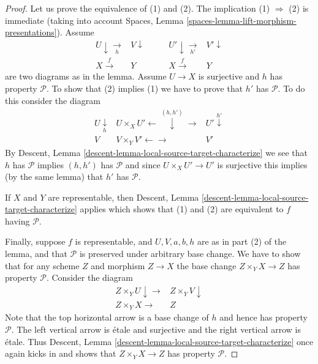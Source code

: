 \begin{proof}
Let us prove the equivalence of (1) and (2).
The implication (1) $\Rightarrow$ (2) is immediate (taking into account
Spaces, Lemma \ref{spaces-lemma-lift-morphism-presentations}).
Assume
$$
\begin{array}{cc}U \downarrow\underset{h}{\longrightarrow} & V \downarrow \\ X \overset{f}{\longrightarrow} & Y\end{array}
\quad\quad
\begin{array}{cc}U' \downarrow\underset{h'}{\longrightarrow} & V' \downarrow \\ X \overset{f}{\longrightarrow} & Y\end{array}
$$
are two diagrams as in the lemma. Assume $U \to X$ is
surjective and $h$ has property $\mathcal{P}$. To show that (2)
implies (1) we have to prove that $h'$ has $\mathcal{P}$. To do
this consider the diagram
$$
\begin{array}{ccc}U \underset{h}{\downarrow} & U \times_X U' \longleftarrow\overset{(h, h')}{\downarrow}\longrightarrow & U' \overset{h'}{\downarrow} \\ V & V \times_Y V' \longleftarrow\longrightarrow & V'\end{array}
$$
By
Descent, Lemma \ref{descent-lemma-local-source-target-characterize}
we see that $h$ has $\mathcal{P}$ implies $(h, h')$ has $\mathcal{P}$
and since $U \times_X U' \to U'$ is surjective this implies (by the
same lemma) that $h'$ has $\mathcal{P}$.

\medskip\noindent
If $X$ and $Y$ are representable, then
Descent, Lemma \ref{descent-lemma-local-source-target-characterize}
applies which shows that (1) and (2) are equivalent to $f$ having
$\mathcal{P}$.

\medskip\noindent
Finally, suppose $f$ is representable, and $U, V, a, b, h$ are
as in part (2) of the lemma, and that $\mathcal{P}$ is preserved under
arbitrary base change. We have to show that for any scheme
$Z$ and morphism $Z \to X$ the base change $Z \times_Y X \to Z$
has property $\mathcal{P}$. Consider the diagram
$$
\begin{array}{cc}Z \times_Y U \downarrow\longrightarrow & Z \times_Y V \downarrow \\ Z \times_Y X \longrightarrow & Z\end{array}
$$
Note that the top horizontal arrow is a base change of $h$ and
hence has property $\mathcal{P}$. The left vertical arrow is \'etale
and surjective and the right vertical arrow is \'etale. Thus
Descent, Lemma \ref{descent-lemma-local-source-target-characterize}
once again kicks in and shows that $Z \times_Y X \to Z$
has property $\mathcal{P}$.
\end{proof}


